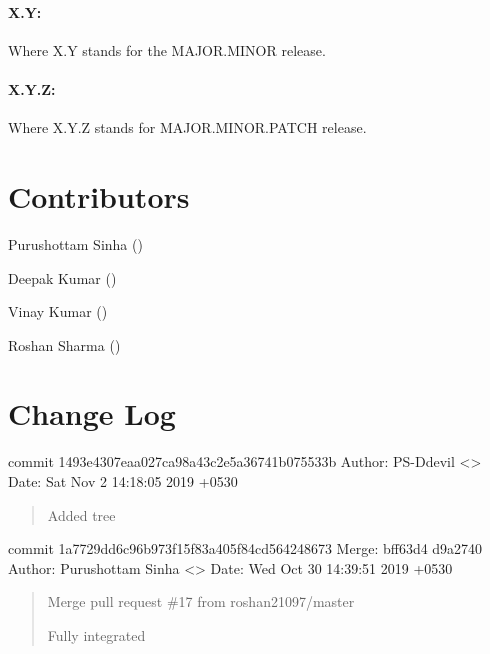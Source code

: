 \documentclass[letterpaper,10pt,english]{sphinxmanual}
\begin{document}
\subsubsection{X.Y:}
\label{\detokenize{developer:x-y}}
Where X.Y stands for the MAJOR.MINOR release.


\subsubsection{X.Y.Z:}
\label{\detokenize{developer:x-y-z}}
Where X.Y.Z stands for MAJOR.MINOR.PATCH release.


\chapter{Contributors}
\label{\detokenize{contributors:contributors}}\label{\detokenize{contributors::doc}}
Purushottam Sinha ()

Deepak Kumar ()

Vinay Kumar ()

Roshan Sharma ()


\chapter{Change Log}
\label{\detokenize{change:change-log}}\label{\detokenize{change::doc}}
commit 1493e4307eaa027ca98a43c2e5a36741b075533b
Author: PS-Ddevil \textless{}\textgreater{}
Date:   Sat Nov 2 14:18:05 2019 +0530
\begin{quote}

Added tree
\end{quote}

commit 1a7729dd6c96b973f15f83a405f84cd564248673
Merge: bff63d4 d9a2740
Author: Purushottam Sinha \textless{}\textgreater{}
Date:   Wed Oct 30 14:39:51 2019 +0530
\begin{quote}

Merge pull request \#17 from roshan21097/master

Fully  integrated
\end{quote}
\end{document}
